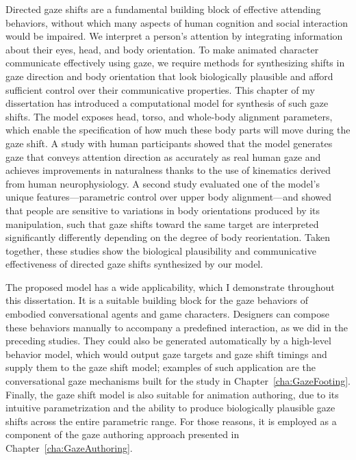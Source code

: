 Directed gaze shifts are a fundamental building block of effective attending behaviors, without which many aspects of human cognition and social interaction would be impaired. We interpret a person's attention by integrating information about their eyes, head, and body orientation. To make animated character communicate effectively using gaze, we require methods for synthesizing shifts in gaze direction and body orientation that look biologically plausible and afford sufficient control over their communicative properties. This chapter of my dissertation has introduced a computational model for synthesis of such gaze shifts. The model exposes head, torso, and whole-body alignment parameters, which enable the specification of how much these body parts will move during the gaze shift. A study with human participants showed that the model generates gaze that conveys attention direction as accurately as real human gaze and achieves improvements in naturalness thanks to the use of kinematics derived from human neurophysiology. A second study evaluated one of the model's unique features---parametric control over upper body alignment---and showed that people are sensitive to variations in body orientations produced by its manipulation, such that gaze shifts toward the same target are interpreted significantly differently depending on the degree of body reorientation. Taken together, these studies show the biological plausibility and communicative effectiveness of directed gaze shifts synthesized by our model.

The proposed model has a wide applicability, which I demonstrate throughout this dissertation. It is a suitable building block for the gaze behaviors of embodied conversational agents and game characters. Designers can compose these behaviors manually to accompany a predefined interaction, as we did in the preceding studies. They could also be generated automatically by a high-level behavior model, which would output gaze targets and gaze shift timings and supply them to the gaze shift model; examples of such application are the conversational gaze mechanisms built for the study in Chapter~\ref{cha:GazeFooting}. Finally, the gaze shift model is also suitable for animation authoring, due to its intuitive parametrization and the ability to produce biologically plausible gaze shifts across the entire parametric range. For those reasons, it is employed as a component of the gaze authoring approach presented in Chapter~\ref{cha:GazeAuthoring}.

